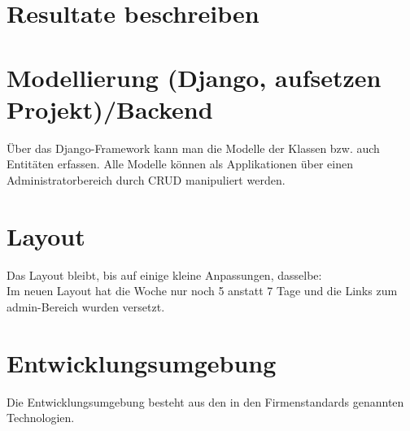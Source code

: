 \section{Resultate beschreiben}
\section{Modellierung (Django, aufsetzen Projekt)/Backend }
Über das Django-Framework kann man die Modelle der Klassen bzw. auch Entitäten erfassen.
Alle Modelle können als Applikationen über einen Administratorbereich durch CRUD manipuliert werden.
\section{Layout}
Das Layout bleibt, bis auf einige kleine Anpassungen, dasselbe:\\
Im neuen Layout hat die Woche nur noch 5 anstatt 7 Tage und die Links zum admin-Bereich wurden versetzt.
\section{Entwicklungsumgebung}
Die Entwicklungsumgebung besteht aus den in den Firmenstandards genannten Technologien.
